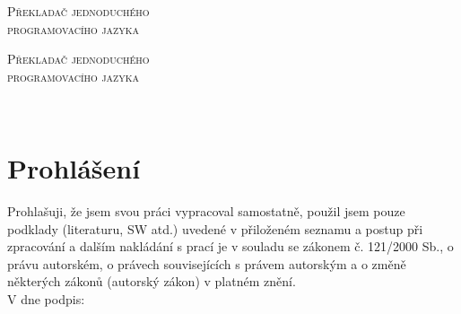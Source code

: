 
\setcounter{page}{-99}

\begin{titlepage}
\begin{center}
\textsc{\Huge Překladač jednoduchého\\programovacího jazyka}\\[0.5cm]
\end{center}
\end{titlepage}

\thispagestyle{empty}
\cleardoublepage


\begin{center}
\textsc{\Huge Překladač jednoduchého\\programovacího jazyka}\\[0.5cm]
\end{center}

\setcounter{page}{1}
\thispagestyle{empty}

\newpage

~\\[7cm]
\section*{Prohlášení}

Prohlašuji, že jsem svou práci vypracoval samostatně, použil jsem pouze
podklady (literaturu, SW atd.) uvedené v přiloženém seznamu a postup při
zpracování a dalším nakládání s prací je v souladu se zákonem č. 121/2000 Sb.,
o právu autorském, o právech souvisejících s právem autorským a o změně
některých zákonů (autorský zákon) v platném znění.\\[0.7cm]

V \makebox[3cm]{\dotfill} dne \makebox[4cm]{\dotfill}
podpis: \makebox[6cm]{\dotfill}

\newpage

~

\newpage
